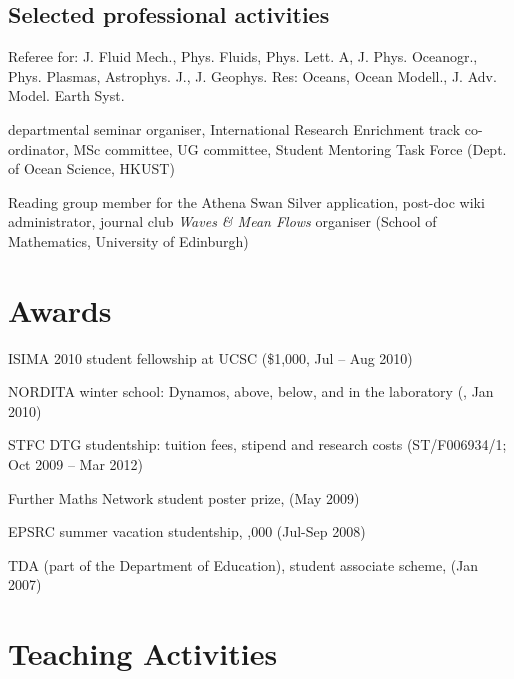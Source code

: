 \documentclass[letterpaper]{article}
\renewenvironment{itemize}{
  \begin{list}{}{
    \setlength{\leftmargin}{1.5em}
  }
}{
  \end{list}
}
\begin{document}
\subsection*{Selected professional activities}
\begin{itemize}

\item[--] Referee for: J. Fluid Mech., Phys. Fluids, Phys. Lett. A, J. Phys.
Oceanogr., Phys. Plasmas, Astrophys. J., J. Geophys. Res: Oceans, Ocean Modell.,
J. Adv. Model. Earth Syst.

\item[--] departmental seminar organiser, International Research Enrichment
track co-ordinator, MSc committee, UG committee, Student Mentoring Task Force
(Dept. of Ocean Science, HKUST)

\item[--] Reading group member for the Athena Swan Silver application, post-doc
wiki administrator, journal club \textit{Waves \& Mean Flows} organiser (School
of Mathematics, University of Edinburgh)

\end{itemize}


\section*{Awards}
\begin{itemize}
	\item[--] ISIMA 2010 student fellowship at UCSC (\$1,000, Jul -- Aug 2010)
	\item[--] NORDITA winter school: Dynamos, above, below, and in the
	laboratory (, Jan 2010)
	\item[--] STFC DTG studentship: tuition fees, stipend and research costs
	(ST/F006934/1; Oct 2009 -- Mar 2012)
	\item[--] Further Maths Network student poster prize,  (May
	2009)
	\item[--] EPSRC summer vacation studentship, ,000 (Jul-Sep
	2008)
	\item[--] TDA (part of the Department of Education), student associate
	scheme,  (Jan 2007)
\end{itemize}


\section*{Teaching Activities}
\end{document}
